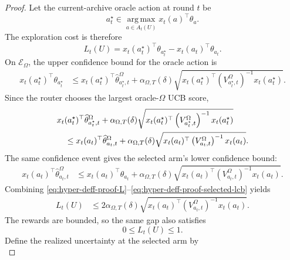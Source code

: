 \documentclass{article} %
\begin{document}
\begin{proof}
Let the current-archive oracle action at round \(t\) be
\begin{equation}
\label{eq:hyper-deff-proof-oracle-action}
a_t^\star
\in
\operatorname*{arg\,max}_{a\in A_t(U)}
x_t(a)^\top\theta_a .
\end{equation}
The exploration cost is therefore
\begin{equation}
\label{eq:hyper-deff-proof-L}
L_t(U)
=
x_t(a_t^\star)^\top\theta_{a_t^\star}
-
x_t(a_t)^\top\theta_{a_t}.
\end{equation}
On \(\mathcal{E}_{\Omega}\), the upper confidence bound for the oracle action is
\begin{align}
\label{eq:hyper-deff-proof-oracle-ucb}
x_t(a_t^\star)^\top\theta_{a_t^\star}
&\le
x_t(a_t^\star)^\top\widehat{\theta}_{a_t^\star,t}^{\Omega}
+
\alpha_{\Omega,T}(\delta)
\sqrt{
x_t(a_t^\star)^\top
\left(V_{a_t^\star,t}^{\Omega}\right)^{-1}
x_t(a_t^\star)
}.
\end{align}
Since the router chooses the largest oracle-\(\Omega\) UCB score,
\begin{align}
\label{eq:hyper-deff-proof-argmax}
&
x_t(a_t^\star)^\top\widehat{\theta}_{a_t^\star,t}^{\Omega}
+
\alpha_{\Omega,T}(\delta)
\sqrt{
x_t(a_t^\star)^\top
\left(V_{a_t^\star,t}^{\Omega}\right)^{-1}
x_t(a_t^\star)
}
\notag
\\
&\quad\le
x_t(a_t)^\top\widehat{\theta}_{a_t,t}^{\Omega}
+
\alpha_{\Omega,T}(\delta)
\sqrt{
x_t(a_t)^\top
\left(V_{a_t,t}^{\Omega}\right)^{-1}
x_t(a_t)
}.
\end{align}
The same confidence event gives the selected arm's lower confidence bound:
\begin{align}
\label{eq:hyper-deff-proof-selected-lcb}
x_t(a_t)^\top\widehat{\theta}_{a_t,t}^{\Omega}
&\le
x_t(a_t)^\top\theta_{a_t}
+
\alpha_{\Omega,T}(\delta)
\sqrt{
x_t(a_t)^\top
\left(V_{a_t,t}^{\Omega}\right)^{-1}
x_t(a_t)
}.
\end{align}
Combining \eqref{eq:hyper-deff-proof-L}--\eqref{eq:hyper-deff-proof-selected-lcb} yields
\begin{align}
\label{eq:hyper-deff-proof-gap-width}
L_t(U)
&\le
2\alpha_{\Omega,T}(\delta)
\sqrt{
x_t(a_t)^\top
\left(V_{a_t,t}^{\Omega}\right)^{-1}
x_t(a_t)
}.
\end{align}
The rewards are bounded, so the same gap also satisfies
\begin{equation}
\label{eq:hyper-deff-proof-gap-one}
0\le L_t(U)\le 1 .
\end{equation}
Define the realized uncertainty at the selected arm by
\begin{equation}

\end{equation}
\end{proof}
\end{document}
